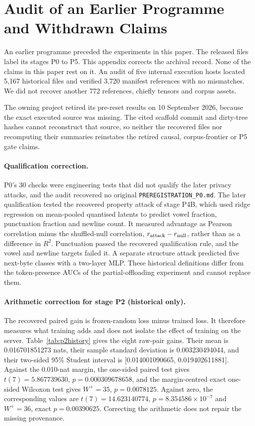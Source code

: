 \documentclass[11pt]{article}
\begin{document}
\clearpage
\section{Audit of an Earlier Programme and Withdrawn Claims}
\label{app:history}
An earlier programme preceded the experiments in this paper. The released files label its stages P0 to P5. This appendix corrects the archival record. None of the claims in this paper rest on it. An audit of five internal execution hosts located 5{,}167 historical files and verified 3{,}720 manifest references with no mismatches. We did not recover another 772 references, chiefly tensors and corpus assets.

The owning project retired its pre-reset results on 10 September 2026, because the exact executed source was missing. The cited scaffold commit and dirty-tree hashes cannot reconstruct that source, so neither the recovered files nor recomputing their summaries reinstates the retired causal, corpus-frontier or P5 gate claims.

\paragraph{Qualification correction.}
P0's 30 checks were engineering tests that did not qualify the later privacy attacks, and the audit recovered no original \nolinkurl{PREREGISTRATION_P0.md}. The later qualification tested the recovered property attack of stage P4B, which used ridge regression on mean-pooled quantised latents to predict vowel fraction, punctuation fraction and newline count. It measured advantage as Pearson correlation minus the shuffled-null correlation, $r_{\rm attack}-r_{\rm null}$, rather than as a difference in $R^2$. Punctuation passed the recovered qualification rule, and the vowel and newline targets failed it. A separate structure attack predicted five next-byte classes with a two-layer MLP. These historical definitions differ from the token-presence AUCs of the partial-offloading experiment and cannot replace them.

\paragraph{Arithmetic correction for stage P2 (historical only).}
The recovered paired gain is frozen-random loss minus trained loss. It therefore measures what training adds and does not isolate the effect of training on the server. Table~\ref{tab:p2history} gives the eight raw-pair gains. Their mean is 0.016701851273 nats, their sample standard deviation is 0.003230494044, and their two-sided 95\% Student interval is [0.014001090665, 0.019402611881]. Against the 0.010-nat margin, the one-sided paired test gives $t(7)=5.867739630$, $p=0.000309678658$, and the margin-centred exact one-sided Wilcoxon test gives $W^+=35$, $p=0.0078125$. Against zero, the corresponding values are $t(7)=14.623140774$, $p=8.354586\times10^{-7}$ and $W^+=36$, exact $p=0.00390625$. Correcting the arithmetic does not repair the missing provenance.
\end{document}
